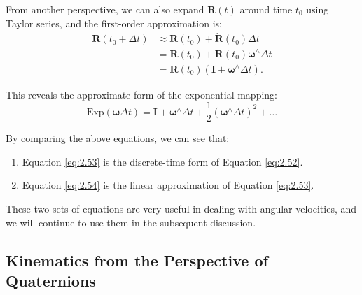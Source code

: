 From another perspective, we can also expand $\mathbf{R}(t)$ around time $t_0$ using Taylor series, and the first-order approximation is:
\begin{equation}\label{eq:2.54}
	\begin{array}{ll}
		\mathbf{R}(t_0 + \Delta t) &\approx \mathbf{R}(t_0) + \dot{\mathbf{R}}(t_0) \Delta t  \\
		& = \mathbf{R}(t_0) + \mathbf{R}(t_0) \boldsymbol{\omega}^\wedge \Delta t \\ 
		& = \mathbf{R}(t_0)(\mathbf{I} + \boldsymbol{\omega}^\wedge \Delta t).
	\end{array}
\end{equation}

This reveals the approximate form of the exponential mapping:
\begin{equation}
	\mathrm{Exp}( \boldsymbol{\omega} \Delta t) = \mathbf{I} + \boldsymbol{\omega}^\wedge \Delta t+ 
	\frac{1}{2}(\boldsymbol{\omega} ^\wedge \Delta t)^2 + \ldots
\end{equation}

By comparing the above equations, we can see that:
\begin{enumerate}
	\item Equation \eqref{eq:2.53} is the discrete-time form of Equation \eqref{eq:2.52}.
	\item Equation \eqref{eq:2.54} is the linear approximation of Equation \eqref{eq:2.53}.
\end{enumerate}

These two sets of equations are very useful in dealing with angular velocities, and we will continue to use them in the subsequent discussion.

\subsection{Kinematics from the Perspective of Quaternions}

